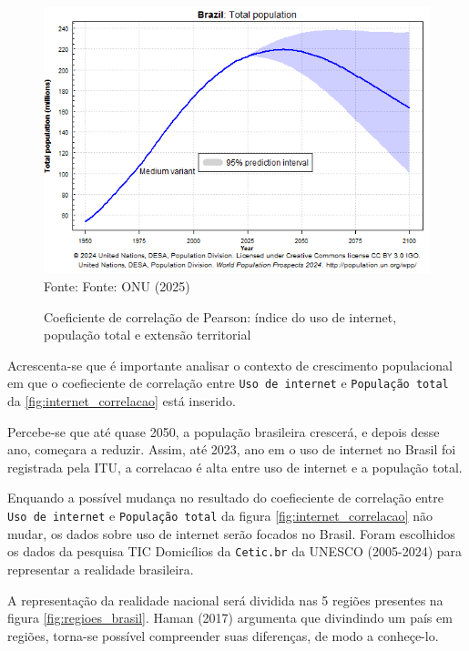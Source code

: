 \begin{figure}[ht]
    \centering
    \caption{Coeficiente de correlação de Pearson: índice do uso de internet, população total e extensão territorial}
    \includegraphics[width=1\linewidth]{figuras/populacao/populacao_brasil.png}
    \label{fig:populacao_brasil}
    \footnotesize{Fonte: Fonte: ONU (2025)}
\end{figure}

\newpage
Acrescenta-se que é importante analisar o contexto de crescimento populacional em que o coefieciente de correlação entre \texttt{Uso de internet} e \texttt{População total} da \ref{fig:internet_correlacao} está inserido. 

Percebe-se que até quase 2050, a população brasileira crescerá, e depois desse ano, começara a reduzir. Assim, até 2023, ano em o uso de internet no Brasil foi registrada pela ITU, a correlacao é alta entre uso de internet e a população total.

Enquando a possível mudança no resultado do coefieciente de correlação entre \texttt{Uso de internet} e \texttt{População total} da figura \ref{fig:internet_correlacao} não mudar, os dados sobre uso de internet serão focados no Brasil. Foram escolhidos os dados da pesquisa TIC Domicílios da \texttt{Cetic.br} da UNESCO (2005-2024) para representar a realidade brasileira. 

A representação da realidade nacional será dividida nas 5 regiões presentes na figura \ref{fig:regioes_brasil}. Haman (2017) argumenta que divindindo um país em regiões, torna-se possível compreender suas diferenças, de modo a conheçe-lo.


